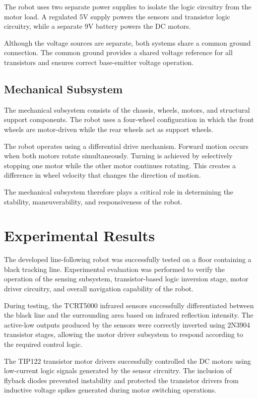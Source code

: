\documentclass[conference]{IEEEtran}
\begin{document}
The robot uses two separate power supplies to isolate the logic circuitry from the motor load. A regulated 5V supply powers the sensors and transistor logic circuitry, while a separate 9V battery powers the DC motors.

Although the voltage sources are separate, both systems share a common ground connection. The common ground provides a shared voltage reference for all transistors and ensures correct base-emitter voltage operation.

\subsection{Mechanical Subsystem}

The mechanical subsystem consists of the chassis, wheels, motors, and structural support components. The robot uses a four-wheel configuration in which the front wheels are motor-driven while the rear wheels act as support wheels.

The robot operates using a differential drive mechanism. Forward motion occurs when both motors rotate simultaneously. Turning is achieved by selectively stopping one motor while the other motor continues rotating. This creates a difference in wheel velocity that changes the direction of motion.

The mechanical subsystem therefore plays a critical role in determining the stability, maneuverability, and responsiveness of the robot.

\section{Experimental Results}

The developed line-following robot was successfully tested on a floor containing a black tracking line. Experimental evaluation was performed to verify the operation of the sensing subsystem, transistor-based logic inversion stage, motor driver circuitry, and overall navigation capability of the robot.

During testing, the TCRT5000 infrared sensors successfully differentiated between the black line and the surrounding area based on infrared reflection intensity. The active-low outputs produced by the sensors were correctly inverted using 2N3904 transistor stages, allowing the motor driver subsystem to respond according to the required control logic.

The TIP122 transistor motor drivers successfully controlled the DC motors using low-current logic signals generated by the sensor circuitry. The inclusion of flyback diodes prevented instability and protected the transistor drivers from inductive voltage spikes generated during motor switching operations.
\end{document}
